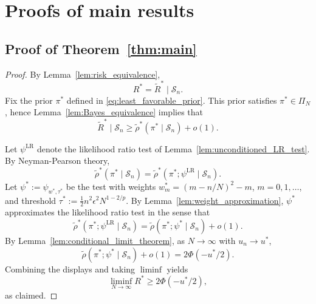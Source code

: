 \documentclass[11pt]{article}
\numberwithin{equation}{section}
\newcommand{\LR}{\mathrm{LR}}
\newcommand{\Scal}{\mathcal{S}}
\begin{document}
\section{Proofs of main results}
\label{sec:proofs}

\subsection{Proof of Theorem~\ref{thm:main}}

\begin{proof}
By Lemma~\ref{lem:risk_equivalence}, 
\[
R^* = \tilde{R}^* \mid \Scal_n.
\]
Fix the prior $\pi^*$ defined in \eqref{eq:least_favorable_prior}. This prior satisfies $\pi^* \in \Pi_N$, hence Lemma~\ref{lem:Bayes_equivalence} implies that
\[
\tilde{R}^*\mid \Scal_n \geq \tilde{\rho}^*(\pi^* \mid \Scal_n) + o(1).
\]

Let $\psi^{\LR}$ denote the likelihood ratio test of Lemma~\ref{lem:unconditioned_LR_test}. By Neyman-Pearson theory, 
\[
\tilde{\rho}^*( \pi^* \mid \Scal_n) = \tilde{\rho}^* ( \pi^* ; \psi^{\LR} \mid \Scal_n).
\]
Let $\psi^* := \psi_{w^*,\tau^*}$ be the test with weights $w_m^* = (m-n/N)^2 - m$, $m=0,1,\ldots$, and threshold $\tau^* := \frac{1}{2} n^2 \epsilon^2 N^{1-2/p}$. By Lemma~\ref{lem:weight_approximation}, $\psi^*$ approximates the likelihood ratio test in the sense that 
\[
\tilde{\rho}^* ( \pi^* ; \psi^{\LR} \mid \Scal_n) = \tilde{\rho}(\pi^*;\psi^* \mid \Scal_n) + o(1).
\]
By Lemma~\ref{lem:conditional_limit_theorem}, as $N\to\infty$ with $u_n \to u^*$,
\[
\tilde{\rho}(\pi^*; \psi^* \mid \Scal_n) + o(1) = 2\Phi(-u^*/2).
\]
Combining the displays and taking $\liminf$ yields
\[
\liminf_{N\to\infty} R^* \geq 2\Phi(-u^*/2),
\]
as claimed.
\end{proof}
\end{document}
